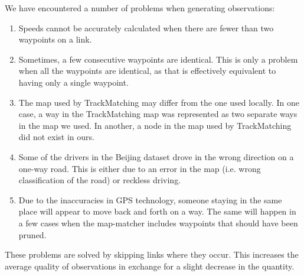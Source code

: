 We have encountered a number of problems when generating observations:

\begin{enumerate}
	\item Speeds cannot be accurately calculated when there are fewer than two waypoints on a link.
	\item Sometimes, a few consecutive waypoints are identical. This is only a problem when all the waypoints are identical, as that is effectively equivalent to having only a single waypoint.
	\item The map used by TrackMatching may differ from the one used locally. In one case, a way in the TrackMatching map was represented as two separate ways in the map we used. In another, a node in the map used by TrackMatching did not exist in ours.
	\item Some of the drivers in the Beijing dataset drove in the wrong direction on a one-way road. This is either due to an error in the map (i.e. wrong classification of the road) or reckless driving.
	\item Due to the inaccuracies in GPS technology, someone staying in the same place will appear to move back and forth on a way. The same will happen in a few cases when the map-matcher includes waypoints that should have been pruned.
\end{enumerate}

These problems are solved by skipping links where they occur. This increases the average quality of observations in exchange for a slight decrease in the quantity.